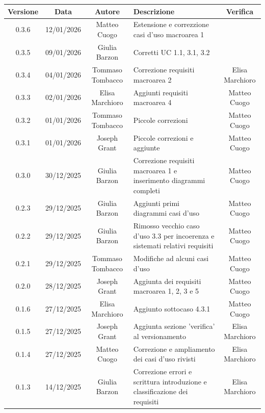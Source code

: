 \documentclass[11pt,a4paper]{article}
\begin{document}
\begin{table}[H]
    \centering
    \begin{tabular}{|c|c|c|>{\raggedright\arraybackslash}p{}|c|}
        \hline
        \textbf{Versione} & \textbf{Data} & \textbf{Autore} & \textbf{Descrizione} & \textbf{Verifica} \\
        \hline
        0.3.6 & 12/01/2026 & Matteo Cuogo & Estensione e correzzione casi d'uso macroarea 1 & \\
        \hline
        0.3.5 & 09/01/2026 & Giulia Barzon & Corretti UC 1.1, 3.1, 3.2 & \\
        \hline
        0.3.4 & 04/01/2026 & Tommaso Tombacco & Correzione requisiti macroarea 2 & Elisa Marchioro\\
        \hline
        0.3.3 & 02/01/2026 & Elisa Marchioro & Aggiunti requisiti macroarea 4 &  Matteo Cuogo\\
        \hline
        0.3.2 & 01/01/2026 & Tommaso Tombacco & Piccole correzioni & Matteo Cuogo\\
        \hline
        0.3.1 & 01/01/2026 & Joseph Grant & Piccole correzioni e aggiunte &  Matteo Cuogo\\
        \hline
        0.3.0 & 30/12/2025 & Giulia Barzon & Correzione requisiti macroarea 1 e inserimento diagrammi completi & Matteo Cuogo \\
        \hline
        0.2.3 & 29/12/2025 & Giulia Barzon & Aggiunti primi diagrammi casi d'uso &  Matteo Cuogo \\
        \hline
        0.2.2 & 29/12/2025 & Giulia Barzon & Rimosso vecchio caso d'uso 3.3 per incoerenza e sistemati relativi requisiti & Matteo Cuogo \\
        \hline
        0.2.1 & 29/12/2025 & Tommaso Tombacco & Modifiche ad alcuni casi d'uso &  Matteo Cuogo\\ 
        \hline
        0.2.0 & 28/12/2025 & Joseph Grant & Aggiunta dei requisiti macroarea 1, 2, 3 e 5 &  Matteo Cuogo\\ 
        \hline
        0.1.6 & 27/12/2025 & Elisa Marchioro & Aggiunto sottocaso 4.3.1 & Matteo Cuogo\\ 
        \hline
        0.1.5 & 27/12/2025 & Joseph Grant & Aggiunta sezione 'verifica' al versionamento & Elisa Marchioro\\ 
        \hline
        0.1.4 & 27/12/2025 & Matteo Cuogo & Correzione e ampliamento dei casi d'uso rivisti & Elisa Marchioro\\
        \hline
        0.1.3 & 14/12/2025 & Giulia Barzon & Correzione errori e scrittura introduzione e classificazione dei requisiti & Elisa Marchioro\\

\end{tabular}
\end{table}
\end{document}
